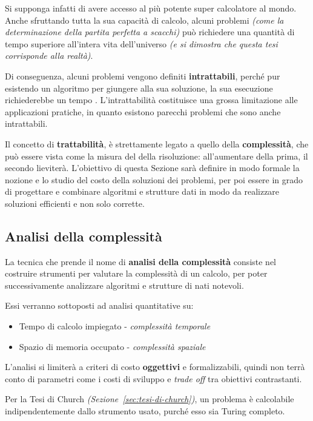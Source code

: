 \documentclass[italian, 10pt]{article}
\begin{document}
Si supponga infatti di avere accesso al più potente super calcolatore al mondo.
Anche sfruttando tutta la sua capacità di calcolo, alcuni problemi \textit{(come la determinazione della partita perfetta a scacchi)} può richiedere una quantità di tempo superiore all'intera vita dell'universo \textit{(e si dimostra che questa tesi corrisponde alla realtà)}.

Di conseguenza, alcuni problemi vengono definiti \textbf{intrattabili}, perché pur esistendo un algoritmo per giungere alla sua soluzione, la sua esecuzione richiederebbe un tempo .
L'intrattabilità costituisce una grossa limitazione alle applicazioni pratiche, in quanto esistono parecchi problemi  che sono anche intrattabili.

Il concetto di \textbf{trattabilità}, è strettamente legato a quello della \textbf{complessità}, che può essere vista come la misura del  della risoluzione: all'aumentare della prima, il secondo lieviterà.
L'obiettivo di questa Sezione sarà definire in modo formale la nozione e lo studio del costo della soluzioni dei problemi, per poi essere in grado di progettare e combinare algoritmi e strutture dati in modo da realizzare soluzioni efficienti e non solo corrette.

\subsection{Analisi della complessità}

La tecnica che prende il nome di \textbf{analisi della complessità} consiste nel costruire strumenti per valutare la complessità di un calcolo, per poter successivamente analizzare algoritmi e strutture di nati notevoli.

Essi verranno sottoposti ad analisi quantitative su:

\begin{itemize}
  \item Tempo di calcolo impiegato - \textit{complessità temporale}
  \item Spazio di memoria occupato - \textit{complessità spaziale}
\end{itemize}

L'analisi si limiterà a criteri di costo \textbf{oggettivi} e formalizzabili, quindi non terrà conto di parametri come i costi di sviluppo e \textit{trade off} tra obiettivi contrastanti.

\bigskip
Per la Tesi di Church \textit{(Sezione~\ref{sec:tesi-di-church})}, un problema è calcolabile indipendentemente dallo strumento usato, purché esso sia Turing completo.
\end{document}
